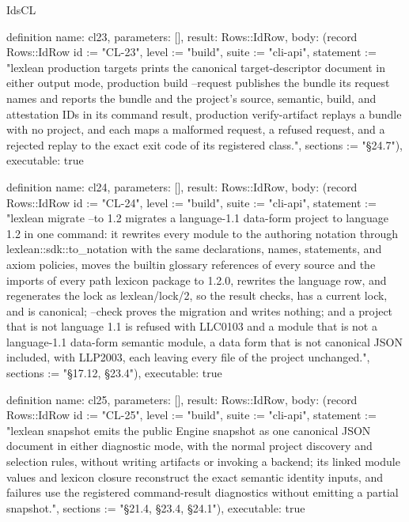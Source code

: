 \begin{lexlean}{IdsCL}
\begin{semanticmodule}
definition{
  name: cl23,
  parameters: [],
  result: Rows::IdRow,
  body: (record Rows::IdRow {id := "CL-23", level := "build", suite := "cli-api", statement := "lexlean production targets prints the canonical target-descriptor document in either output mode, production build --request publishes the bundle its request names and reports the bundle and the project's source, semantic, build, and attestation IDs in its command result, production verify-artifact replays a bundle with no project, and each maps a malformed request, a refused request, and a rejected replay to the exact exit code of its registered class.", sections := "§24.7"}),
  executable: true
}

definition{
  name: cl24,
  parameters: [],
  result: Rows::IdRow,
  body: (record Rows::IdRow {id := "CL-24", level := "build", suite := "cli-api", statement := "lexlean migrate --to 1.2 migrates a language-1.1 data-form project to language 1.2 in one command: it rewrites every module to the authoring notation through lexlean::sdk::to_notation with the same declarations, names, statements, and axiom policies, moves the builtin glossary references of every source and the imports of every path lexicon package to 1.2.0, rewrites the language row, and regenerates the lock as lexlean/lock/2, so the result checks, has a current lock, and is canonical; --check proves the migration and writes nothing; and a project that is not language 1.1 is refused with LLC0103 and a module that is not a language-1.1 data-form semantic module, a data form that is not canonical JSON included, with LLP2003, each leaving every file of the project unchanged.", sections := "§17.12, §23.4"}),
  executable: true
}

definition{
  name: cl25,
  parameters: [],
  result: Rows::IdRow,
  body: (record Rows::IdRow {id := "CL-25", level := "build", suite := "cli-api", statement := "lexlean snapshot emits the public Engine snapshot as one canonical JSON document in either diagnostic mode, with the normal project discovery and selection rules, without writing artifacts or invoking a backend; its linked module values and lexicon closure reconstruct the exact semantic identity inputs, and failures use the registered command-result diagnostics without emitting a partial snapshot.", sections := "§21.4, §23.4, §24.1"}),
  executable: true
}
\end{semanticmodule}
\end{lexlean}
